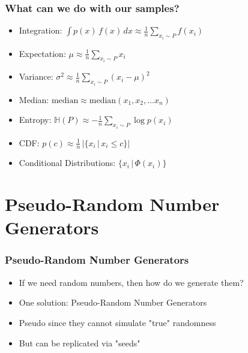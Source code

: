 \documentclass{beamer}
\begin{document}


\begin{frame}
\frametitle{What can we do with our samples?}
\begin{itemize}
  \item Integration: $\int p(x) \, f(x) \, dx \approx \frac{1}{n} \sum_{x_i \sim P} f(x_i) $
  \item Expectation: $ \mu \approx \frac{1}{n} \sum_{x_i \sim P} x_i $
  \item Variance: $ \sigma^2 \approx \frac{1}{n} \sum_{x_i \sim P} \left( x_i - \mu \right)^2$
  \item Median: $\text{median} \approx \text{median} (x_1, x_2, \hdots x_n)$
  \item Entropy: $\mathbb{H}(P) \approx - \frac{1}{n} \sum_{x_i \sim P} \log p (x_i)$
  \item CDF: $p(c) \approx \frac{1}{n} \, \vert \{ x_i \, | \, x_i \leq c \} \vert$
  \item Conditional Distributions: $\{ x_i \, | \, \Phi \left( x_i \right)  \}$
\end{itemize}
\end{frame}




\section{Pseudo-Random Number Generators}
\begin{frame}
\frametitle{Pseudo-Random Number Generators}
\begin{itemize}
  \item If we need random numbers, then how do we generate them?
  \item One solution: Pseudo-Random Number Generators
  \item Pseudo since they cannot simulate "true" randomness
  \item But can be replicated via "seeds"
\end{itemize}
\end{frame}
\end{document}
